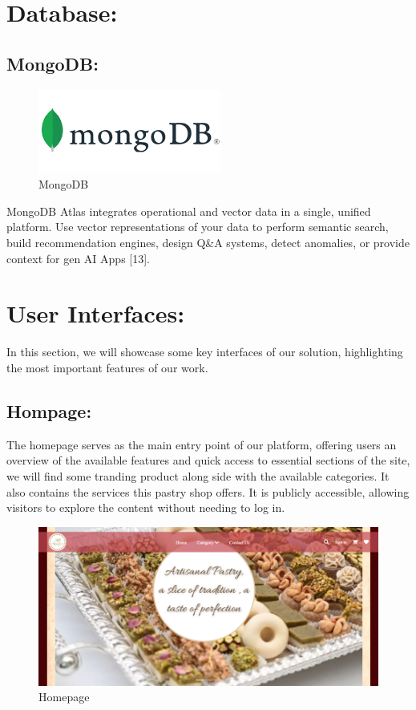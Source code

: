 \section{Database:}

\subsection{MongoDB:}

\begin{figure}[!h]
\begin{center}
\includegraphics[width=6cm]{images/mongodb.png}
\end{center}
\caption{MongoDB}
\end{figure}

MongoDB Atlas integrates operational and vector data in a single, unified platform. Use vector representations of your data to perform semantic search, build recommendation engines, design Q\&A systems, detect anomalies, or provide context for gen AI Apps [13].

\section{User Interfaces:}

In this section, we will showcase some key interfaces of our solution, highlighting the most important features of our work.

\subsection{Hompage:}

The homepage serves as the main entry point of our platform, offering users an overview of the available features and quick access to essential sections of the site, we will find some tranding product along side with the available categories. It also contains the services this pastry shop offers. It is publicly accessible, allowing visitors to explore the content without needing to log in.

\begin{figure}[!h]
\begin{center}
\includegraphics{images/Homepage.png}
\end{center}
\caption{Homepage}
\end{figure}

